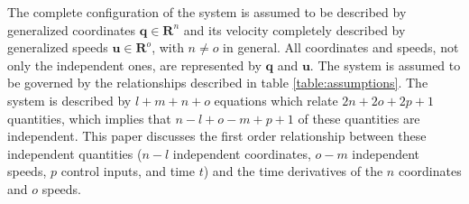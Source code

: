 \documentclass{svjour3}                     %
\begin{document}
The complete configuration of the system is assumed to be described by
generalized coordinates $\bm{q}\in\bm{R}^n$ and its velocity completely
described by generalized speeds $\bm{u}\in\bm{R}^o$, with $n \ne o$ in general.
All coordinates and speeds, not only the independent ones, are represented by
$\bm{q}$ and $\bm{u}$.  The system is assumed to be governed by the
relationships described in table \ref{table:assumptions}.  The system is
described by $l + m + n + o$ equations which relate $2n + 2o + 2p + 1$
quantities, which implies that $n - l + o - m + p + 1$ of these quantities are
independent.  This paper discusses the first order relationship between these
independent quantities ($n-l$ independent coordinates, $o-m$ independent
speeds, $p$ control inputs, and time $t$) and the time derivatives of the $n$
coordinates and $o$ speeds.
\end{document}
